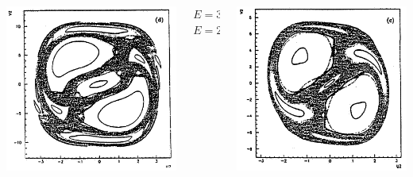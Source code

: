 \documentclass[a4,compress]{beamer}
\begin{document}
\begin{frame}
\begin{columns}[c]
\begin{column}{0.35\textwidth}
    \includegraphics[height=0.45\textheight]{ponicare-sections-e_240}
  \end{column}
  \begin{column}{0.15\textwidth}
    \small \centering \(E = 30A\) \\
    \vspace{3cm}
    \(E = 240A\)
  \end{column}
  \begin{column}{0.35\textwidth}
    \includegraphics[height=0.45\textheight]{ponicare-sections-e_120}


\end{column}
\end{columns}
\end{frame}
\end{document}
